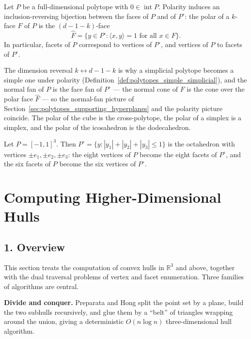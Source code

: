 \begin{theorem}\label{thm:polytopes_polar_reversal}
  Let $P$ be a full-dimensional polytope with $0 \in \operatorname{int} P$.
  Polarity induces an inclusion-reversing bijection between the faces of $P$
  and of $P^{\circ}$: the polar of a $k$-face $F$ of $P$ is the
  $(d - 1 - k)$-face
  \[
    \widehat{F} = \{ y \in P^{\circ} : \langle x, y \rangle = 1
      \text{ for all } x \in F \} .
  \]
  In particular, facets of $P$ correspond to vertices of $P^{\circ}$, and
  vertices of $P$ to facets of $P^{\circ}$.
\end{theorem}

The dimension reversal $k \leftrightarrow d-1-k$ is why a simplicial
polytope becomes a simple one under polarity
(Definition~\ref{def:polytopes_simple_simplicial}), and the normal fan of $P$
is the face fan of $P^{\circ}$ --- the normal cone of $F$ is the cone over
the polar face $\widehat{F}$ --- so the normal-fan picture of
Section~\ref{sec:polytopes_supporting_hyperplanes} and the polarity picture
coincide. The polar of the cube is the cross-polytope, the polar of a
simplex is a simplex, and the polar of the icosahedron is the dodecahedron.


\begin{example}
  Let $P = [-1, 1]^3$. Then $P^{\circ} = \{ y : |y_1| + |y_2| + |y_3| \le 1
  \}$ is the octahedron with vertices $\pm e_1, \pm e_2, \pm e_3$: the eight
  vertices of $P$ become the eight facets of $P^{\circ}$, and the six facets
  of $P$ become the six vertices of $P^{\circ}$.
\end{example}

\section{Computing Higher-Dimensional Hulls}
\label{sec:polytopes_computation}

\subsection{1. Overview}

This section treats the computation of convex hulls in $\mathbb{R}^3$ and
above, together with the dual traversal problems of vertex and facet
enumeration. Three families of algorithms are central.

\textbf{Divide and conquer.} Preparata and Hong \cite{preparata1977} split
the point set by a plane, build the two subhulls recursively, and glue them
by a ``belt'' of triangles wrapping around the union, giving a deterministic
$O(n \log n)$ three-dimensional hull algorithm.


